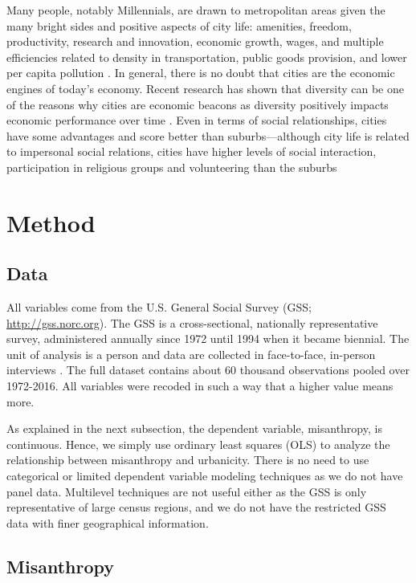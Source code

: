 \documentclass[11pt, letterpaper]{article}
\begin{document}
\begin{spacing}{1.4}
Many people, notably  Millennials, are drawn to metropolitan areas \citep{aok-swbGenYcity18} given the many bright sides and positive aspects of city life: amenities, freedom, productivity, research and innovation, economic growth, wages, and multiple efficiencies related to
density in transportation, public goods provision, and lower per capita pollution \citep{tonnies57,osullivan09,meyer13,rosenthal02,bettencourt10}.
In general, there is no doubt that cities are the economic engines of today's
economy. Recent research has shown that diversity can be one of the reasons why
cities are economic beacons as diversity positively impacts economic performance
over time \citep[e.g.,][]{rodriguez2019does}. Even in terms of social
relationships, cities have some advantages and score better than
suburbs---although city life is related to impersonal social relations, cities have higher levels of social interaction, participation in religious groups and volunteering than the suburbs \citep{nguyen10,mazumdar18}
%


\section*{Method} 

\subsection*{Data}

All variables come from the U.S. General Social Survey (GSS;
\url{http://gss.norc.org}). The GSS is a cross-sectional, nationally
representative survey, administered annually since 1972 until 1994 when it
became biennial. The unit of analysis is a person and data are collected in face-to-face, in-person interviews \citep{davis07}. The full dataset contains about 60 thousand observations pooled over 1972-2016. All variables were recoded in such a way that a higher value means more. 

As explained in the next subsection, the dependent variable, misanthropy, is continuous. Hence, we simply use ordinary least squares (OLS) to analyze the relationship between misanthropy and urbanicity.
{There is no need to use categorical or limited dependent variable modeling techniques as we do not have panel data. Multilevel techniques are not useful either as the GSS is only representative of large census regions, and we do not have the restricted GSS data with finer geographical information.} 

\subsection*{Misanthropy}


\end{spacing}
\end{document}
